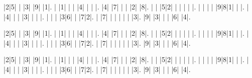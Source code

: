 \documentclass[letterpaper,10pt]{article}
\title{}
\author{Germán Avendaño Ramírez}
\begin{document}
\begin{multicols}{2}
\begin{sudoku}
|2|5| | |3| |9| |1|.
| |1| | | |4| | | |.
|4| |7| | | |2| |8|.
| | |5|2| | | | | |.
| | | | |9|8|1| | |.
| |4| | | |3| | | |.
| | | |3|6| | |7|2|.
| |7| | | | | | |3|.
|9| |3| | | |6| |4|.
\end{sudoku}
\begin{sudoku}
|2|5| | |3| |9| |1|.
| |1| | | |4| | | |.
|4| |7| | | |2| |8|.
| | |5|2| | | | | |.
| | | | |9|8|1| | |.
| |4| | | |3| | | |.
| | | |3|6| | |7|2|.
| |7| | | | | | |3|.
|9| |3| | | |6| |4|.
\end{sudoku}
\end{multicols}
\begin{sudoku}
|2|5| | |3| |9| |1|.
| |1| | | |4| | | |.
|4| |7| | | |2| |8|.
| | |5|2| | | | | |.
| | | | |9|8|1| | |.
| |4| | | |3| | | |.
| | | |3|6| | |7|2|.
| |7| | | | | | |3|.
|9| |3| | | |6| |4|.
\end{sudoku}
\end{document}
